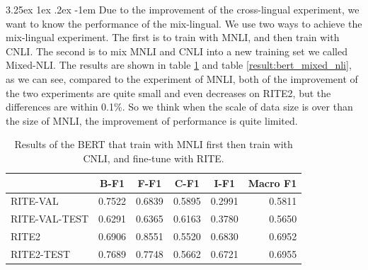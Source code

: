 \documentclass[12pt]{article}
\makeatletter
\renewcommand\paragraph{\@startsection{paragraph}{5}{\z@}%
  {3.25ex \@plus1ex \@minus.2ex}%
  {-1em}%
  {\normalfont\normalsize\bfseries}}
\makeatother
\begin{document}
\begin{CJK*}{UTF8}{bkai}
\begin{spacing}{1.77}
\paragraph{}
Due to the improvement of the cross-lingual experiment, we want to know the performance of the mix-lingual. We use two ways to achieve the mix-lingual experiment. The first is to train with MNLI, and then train with CNLI. The second is to mix MNLI and CNLI into a new training set we called Mixed-NLI. The results are shown in table \ref{result:bert_mnli_cnli} and table \ref{result:bert_mixed_nli}, as we can see, compared to the experiment of MNLI, both of the improvement of the two experiments are quite small and even decreases on RITE2, but the differences are within 0.1\%. So we think when the scale of data size is over than the size of MNLI, the improvement of performance is quite limited.

\begin{table}[H]
  \centering
  \setlength{\extrarowheight}{-3pt}
  \begin{tabular}{|l|r|r|r|r|r|}
  \hline
   & \multicolumn{1}{c|}{B-F1} & \multicolumn{1}{c|}{F-F1} & \multicolumn{1}{c|}{C-F1} & \multicolumn{1}{c|}{I-F1} & \multicolumn{1}{c|}{Macro F1} \\ \hline
  RITE-VAL & 0.7522 & 0.6839 & 0.5895 & 0.2991 & 0.5811 \\ \hline
  RITE-VAL-TEST & 0.6291 & 0.6365 & 0.6163 & 0.3780 & 0.5650 \\ \hline
  RITE2 & 0.6906 & 0.8551 & 0.5520 & 0.6830 & 0.6952 \\ \hline
  RITE2-TEST & 0.7689 & 0.7748 & 0.5662 & 0.6721 & 0.6955 \\ \hline
  \end{tabular}
  \caption{Results of the BERT that train with MNLI first then train with CNLI, and fine-tune with RITE.}
  \label{result:bert_mnli_cnli}
\end{table}


\end{spacing}
\end{CJK*}
\end{document}
